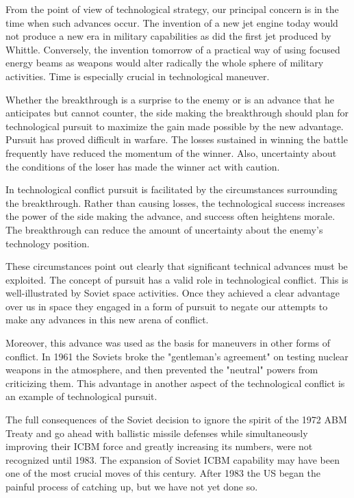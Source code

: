 From the point of view of technological strategy, our principal concern is in the time when such advances occur. The invention of a new jet engine today would not produce a new era in military capabilities as did the first jet produced by Whittle. Conversely, the invention tomorrow of a practical way of using focused energy beams as weapons would alter radically the whole sphere of military activities. Time is especially crucial in technological maneuver.

Whether the breakthrough is a surprise to the enemy or is an advance that he anticipates but cannot counter, the side making the breakthrough should plan for technological pursuit to maximize the gain made possible by the new advantage. Pursuit has proved difficult in warfare. The losses sustained in winning the battle frequently have reduced the momentum of the winner. Also, uncertainty about the conditions of the loser has made the winner act with caution.

In technological conflict pursuit is facilitated by the circumstances surrounding the breakthrough. Rather than causing losses, the technological success increases the power of the side making the advance, and success often heightens morale. The breakthrough can reduce the amount of uncertainty about the enemy's technology position.

These circumstances point out clearly that significant technical advances must be exploited. The concept of pursuit has a valid role in technological conflict. This is well-illustrated by Soviet space activities. Once they achieved a clear advantage over us in space they engaged in a form of pursuit to negate our attempts to make any advances in this new arena of conflict.

Moreover, this advance was used as the basis for maneuvers in other forms of conflict. In 1961 the Soviets broke the "gentleman's agreement" on testing nuclear weapons in the atmosphere, and then prevented the "neutral" powers from criticizing them. This advantage in another aspect of the technological conflict is an example of technological pursuit.

The full consequences of the Soviet decision to ignore the spirit of the 1972 ABM Treaty and go ahead with ballistic missile defenses while simultaneously improving their ICBM force and greatly increasing its numbers, were not recognized until 1983. The expansion of Soviet ICBM capability may have been one of the most crucial moves of this century. After 1983 the US began the painful process of catching up, but we have not yet done so.

